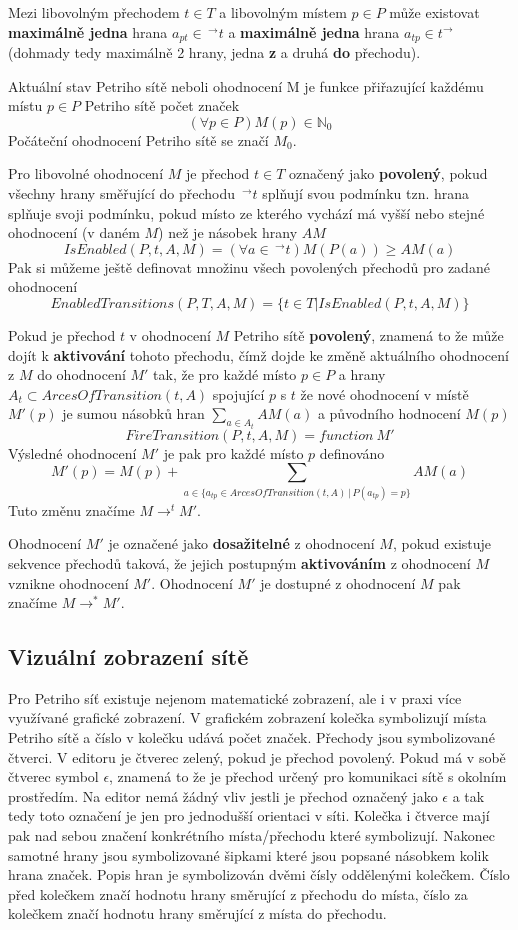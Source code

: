 \documentclass[
  biblatex,
  glossaries,
]{kidiplom}
\begin{document}
Mezi libovolným přechodem $t \in T$ a libovolným místem $p \in P$ může existovat \textbf{maximálně jedna} 
hrana $a_{pt} \in \,^\to t$
a \textbf{maximálně jedna} hrana $a_{tp} \in t ^\to$ (dohmady tedy maximálně 2 hrany, jedna \textbf{z} a druhá \textbf{do} přechodu).

Aktuální stav Petriho sítě neboli ohodnocení M je funkce přiřazující každému
místu $p \in P$ Petriho sítě počet značek
$$(\forall p \in P) M(p) \in \mathbb{N}_0$$
Počáteční ohodnocení Petriho sítě se značí $M_{0}$.

Pro libovolné ohodnocení $M$ je přechod $t \in T$ označený jako \textbf{povolený},
pokud všechny hrany směřující do přechodu $\,^\to t$ splňují svou podmínku tzn.
hrana splňuje svoji podmínku, pokud místo ze kterého vychází má vyšší nebo stejné ohodnocení
(v daném $M$) než je násobek hrany $AM$
$$IsEnabled(P,t,A,M) = (\forall a \in \,^\to t)M(P(a)) \geq AM(a)$$
Pak si můžeme ještě definovat množinu všech povolených přechodů pro zadané ohodnocení
$$
  EnabledTransitions(P,T,A,M) =
  \{ t \in T | IsEnabled(P,t,A,M) \}
$$

Pokud je přechod $t$ v ohodnocení $M$ Petriho sítě \textbf{povolený}, znamená to že může dojít
k \textbf{aktivování} tohoto přechodu, čímž dojde ke změně aktuálního ohodnocení z $M$ do ohodnocení $M'$
tak, že pro každé místo $p \in P$ a hrany $A_{t} \subset ArcesOfTransition(t,A)$ 
spojující $p$ s $t$ že nové ohodnocení 
v místě $M'(p)$ je sumou násobků 
hran $\sum_{a \in A_{t}} AM(a)$ a původního hodnocení $M(p)$
$$
  FireTransition(P,t,A,M) = function\:M'
$$
Výsledné ohodnocení $M'$ je pak pro každé místo $p$ definováno
$$
  M'(p) = M(p) + \sum_{a \in \{a_{tp} \in ArcesOfTransition(t,A) \,|\, P(a_{tp}) = p \}} AM(a)
$$
Tuto změnu značíme $M \to ^t M'$.

Ohodnocení $M'$ je označené jako 
\textbf{dosažitelné} z ohodnocení $M$, 
pokud existuje sekvence přechodů taková, že jejich postupným 
\textbf{aktivováním} z ohodnocení $M$ vznikne ohodnocení $M'$.
Ohodnocení $M'$ je dostupné z ohodnocení $M$ pak značíme 
$M \to ^* M'$.


\subsection{Vizuální zobrazení sítě}

Pro Petriho síť existuje nejenom matematické zobrazení, ale i
v praxi více využívané grafické zobrazení. 
V grafickém zobrazení kolečka symbolizují místa Petriho sítě
a číslo v kolečku udává počet značek. 
Přechody jsou symbolizované 
čtverci. V editoru je čtverec zelený, pokud je přechod povolený.
Pokud má v sobě čtverec symbol $\epsilon$, znamená to že je 
přechod určený pro komunikaci sítě s okolním prostředím.
Na editor nemá žádný vliv jestli je přechod označený jako $\epsilon$
a tak tedy toto označení je jen pro jednodušší orientaci v síti.
Kolečka i čtverce mají pak nad sebou značení 
konkrétního místa/přechodu které symbolizují. 
Nakonec samotné hrany jsou symbolizované šipkami které jsou 
popsané násobkem kolik hrana  značek.
Popis hran je symbolizován dvěmi čísly oddělenými kolečkem.
Číslo před kolečkem značí hodnotu hrany směrující z přechodu 
do místa, číslo za kolečkem značí hodnotu hrany směrující z 
místa do přechodu.
\end{document}
